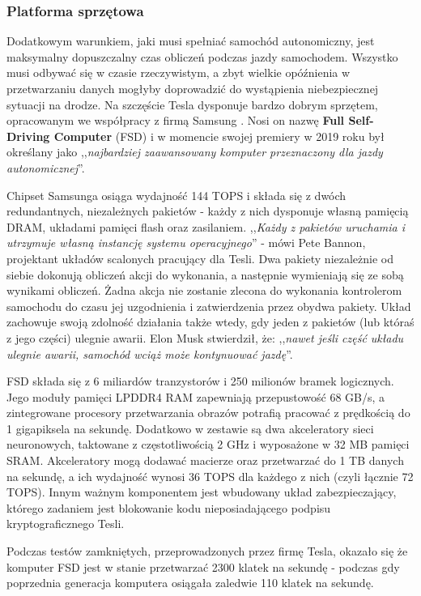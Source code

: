 \subsubsection{Platforma sprzętowa}
Dodatkowym warunkiem, jaki musi spełniać samochód autonomiczny, jest maksymalny dopuszczalny czas obliczeń podczas jazdy samochodem. Wszystko musi odbywać się w czasie rzeczywistym, a zbyt wielkie opóźnienia w przetwarzaniu danych mogłyby doprowadzić do wystąpienia niebezpiecznej sytuacji na drodze. Na szczęście Tesla dysponuje bardzo dobrym sprzętem, opracowanym we współpracy z firmą Samsung \cite{wiggers:teslaDrivingChip}. Nosi on nazwę \textbf{Full Self-Driving Computer} (FSD) i w momencie swojej premiery w 2019 roku był określany jako ,,\textit{najbardziej zaawansowany komputer przeznaczony dla jazdy autonomicznej}''.

Chipset Samsunga osiąga wydajność 144 TOPS i składa się z dwóch redundantnych, niezależnych pakietów - każdy z nich dysponuje własną pamięcią DRAM, układami pamięci flash oraz zasilaniem. ,,\textit{Każdy z pakietów uruchamia i utrzymuje własną instancję systemu operacyjnego}'' - mówi Pete Bannon, projektant układów scalonych pracujący dla Tesli. Dwa pakiety niezależnie od siebie dokonują obliczeń akcji do wykonania, a następnie wymieniają się ze sobą wynikami obliczeń. Żadna akcja nie zostanie zlecona do wykonania kontrolerom samochodu do czasu jej uzgodnienia i zatwierdzenia przez obydwa pakiety. Układ zachowuje swoją zdolność działania także wtedy, gdy jeden z pakietów (lub któraś z jego części) ulegnie awarii. Elon Musk stwierdził, że: ,,\textit{nawet jeśli część układu ulegnie awarii, samochód wciąż może kontynuować jazdę}''.

FSD składa się z 6 miliardów tranzystorów i 250 milionów bramek logicznych. Jego moduły pamięci LPDDR4 RAM zapewniają przepustowość 68 GB/s, a zintegrowane procesory przetwarzania obrazów potrafią pracować z prędkością do 1 gigapiksela na sekundę. Dodatkowo w zestawie są dwa akceleratory sieci neuronowych, taktowane z częstotliwością 2 GHz i wyposażone w 32 MB pamięci SRAM. Akceleratory mogą dodawać macierze oraz przetwarzać do 1 TB danych na sekundę, a ich wydajność wynosi 36 TOPS dla każdego z nich (czyli łącznie 72 TOPS). Innym ważnym komponentem jest wbudowany układ zabezpieczający, którego zadaniem jest blokowanie kodu nieposiadającego podpisu kryptograficznego Tesli.

Podczas testów zamkniętych, przeprowadzonych przez firmę Tesla, okazało się że komputer FSD jest w stanie przetwarzać 2300 klatek na sekundę - podczas gdy poprzednia generacja komputera osiągała zaledwie 110 klatek na sekundę. \\

